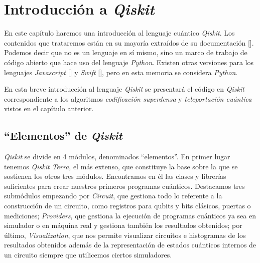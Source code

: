 \chapter{Introducción a \textit{Qiskit}}

En este capítulo haremos una introducción al lenguaje cuántico \textit{Qiskit}. Los contenidos que trataremos están en su mayoría extraídos de su documentación [\cite{qiskit2020doc}]. Podemos decir que no es un lenguaje en sí mismo, sino un marco de trabajo de código abierto que hace uso del lenguaje \textit{Python}. Existen otras versiones para los lenguajes \textit{Javascript} [\cite{qiskit2017javscript}] y \textit{Swift} [\cite{qiskit2017swift}], pero en esta memoria se considera \textit{Python}.

En esta breve introducción al lenguaje \textit{Qiskit} se presentará el código en \textit{Qiskit} correspondiente a los algoritmos \textit{codificación superdensa} y \textit{teleportación cuántica} vistos en el capítulo anterior.

\section{``Elementos'' de \textit{Qiskit}}
\label{sec:sec51}

\textit{Qiskit} se divide en 4 módulos, denominados ``elementos''. En primer lugar tenemos \textit{Qiskit Terra}, el más extenso, que constituye la base sobre la que se sostienen los otros tres módulos. Encontramos en él las clases y librerías  suficientes para crear nuestros primeros programas cuánticos. Destacamos tres submódulos empezando por \textit{Circuit}, que gestiona todo lo referente a la construcción de un circuito, como registros para qubits y bits clásicos, puertas o mediciones; \textit{Providers}, que gestiona la ejecución de programas cuánticos ya sea en simulador o en máquina real y gestiona también los resultados obtenidos; por último, \textit{Visualization}, que nos permite visualizar circuitos e histogramas de los resultados obtenidos además de la representación de estados cuánticos internos de un circuito siempre que utilicemos ciertos simuladores.

